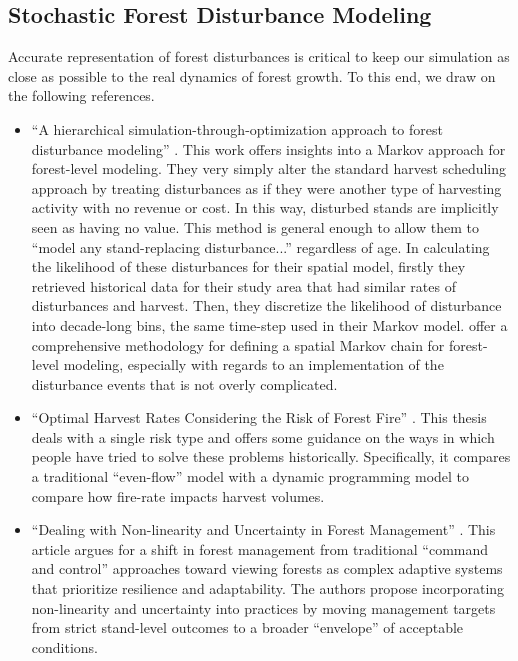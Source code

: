 \documentclass[12pt]{report}
\begin{document}
\subsection{Stochastic Forest Disturbance Modeling}
Accurate representation of forest disturbances is critical to keep our simulation as close as possible to the real dynamics of forest growth. To this end, we draw on the following references.
\begin{itemize}
\item ``A hierarchical simulation-through-optimization approach to forest disturbance modeling'' \parencite{campbellHierarchicalSimulationthroughoptimizationApproach2007}.
    This work offers insights into a Markov approach for forest-level modeling. They very simply alter the standard harvest scheduling approach by treating disturbances as if they were another type of harvesting activity with no revenue or cost. In this way, disturbed stands are implicitly seen as having no value. This method is general enough to allow them to ``model any stand-replacing disturbance...'' regardless of age. In calculating the likelihood of these disturbances for their spatial model, firstly they retrieved historical data for their study area that had similar rates of disturbances and harvest. Then, they discretize the likelihood of disturbance into decade-long bins, the same time-step used in their Markov model. \textcite{campbellHierarchicalSimulationthroughoptimizationApproach2007} offer a comprehensive methodology for defining a spatial Markov chain for forest-level modeling, especially with regards to an implementation of the disturbance events that is not overly complicated.
    
\item ``Optimal Harvest Rates Considering the Risk of Forest Fire'' \parencite{stevensOptimalHarvestRates1986}.
    This thesis deals with a single risk type and offers some guidance on the ways in which people have tried to solve these problems historically. Specifically, it compares a traditional ``even-flow'' model with a dynamic programming model to compare how fire-rate impacts harvest volumes.
    
\item ``Dealing with Non-linearity and Uncertainty in Forest Management'' \parencite{messierDealingNonlinearityUncertainty2016}.
This article argues for a shift in forest management from traditional ``command and control'' approaches toward viewing forests as complex adaptive systems that prioritize resilience and adaptability. The authors propose incorporating non-linearity and uncertainty into practices by moving management targets from strict stand-level outcomes to a broader ``envelope'' of acceptable conditions.


\end{itemize}
\end{document}
